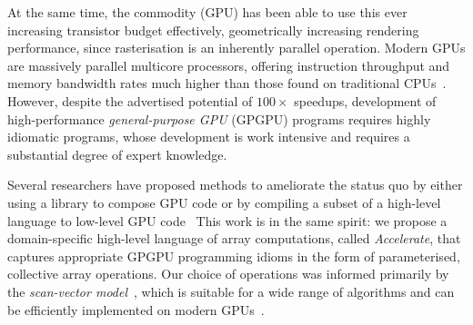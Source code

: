 At the same time, the commodity  (GPU) has been
able to use this ever increasing transistor budget effectively, geometrically
increasing rendering performance, since rasterisation is an inherently parallel
operation.
%
Modern GPUs are massively parallel multicore processors, offering instruction
throughput and memory bandwidth rates much higher than those found on
traditional CPUs~\cite{NVIDIA:2012wf}. However, despite the advertised potential
of $100\times$ speedups, development of high-performance \emph{general-purpose
GPU} (GPGPU)
programs requires highly idiomatic programs, whose development is work intensive
and requires a substantial degree of expert knowledge.

Several researchers have proposed methods to ameliorate the status quo by either
using a library to compose GPU code or by compiling a subset of a high-level
language to low-level GPU
code~\cite{McCool:2004,Bond:2010bd,ThrustAParallelT:ub,Catanzaro:2011cn,Mainland:2010vj,CLyther:EvXSiruK,Muranushi:2012eh}
This work is in the same spirit: we propose a domain-specific high-level
language of array computations, called \emph{Accelerate}, that captures
appropriate GPGPU programming idioms in the form of parameterised, collective
array operations. Our choice of operations was informed primarily by the
\emph{scan-vector model}~\cite{Chatterjee:1990vj}, which is suitable for a wide
range of algorithms and can be efficiently implemented on modern
GPUs~\cite{Sengupta:2007tc}.

